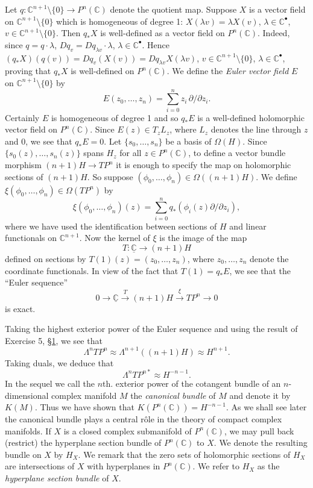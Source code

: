 Let $q:\mathbb C^{n+1}\setminus\{0\}\to P^n(\mathbb C)$ denote the quotient map. Suppose $X$ is a vector field on $\mathbb C^{n+1}\setminus\{0\}$ which is homogeneous of degree 1: $X(\lambda v)=\lambda X(v)$, $\lambda\in\mathbb C^\bullet$, $v\in\mathbb C^{n+1}\setminus\{0\}$. Then $q_*X$ is well-defined as a vector field on $P^n(\mathbb C)$. Indeed, since $q=q\cdot\lambda$, $Dq_v=Dq_{\lambda v}\cdot\lambda$, $\lambda\in\mathbb C^\bullet$. Hence $(q_*X)(q(v))=Dq_v(X(v))=Dq_{\lambda v}X(\lambda v)$, $v\in\mathbb C^{n+1}\setminus\{0\}$, $\lambda\in\mathbb C^\bullet$, proving that $q_*X$ is well-defined on $P^n(\mathbb C)$. We define the \emph{Euler vector field} $E$ on $\mathbb C^{n+1}\setminus\{0\}$ by
\[E(z_0,\ldots,z_n)=\sum_{i=0}^nz_i\,\partial/\partial z_i.\]
Certainly $E$ is homogeneous of degree 1 and so $q_*E$ is a well-defined holomorphic vector field on $P^n(\mathbb C)$. Since $E(z)\in T_zL_z$, where $L_z$ denotes the line through $z$ and 0, we see that $q_*E=0$. Let $\{s_0,\ldots,s_n\}$ be a basis of $\Omega(H)$. Since $\{s_0(z),\ldots,s_n(z)\}$ spans $H_z$ for all $z\in P^n(\mathbb C)$, to define a vector bundle morphism $(n+1)H\to TP^n$ it is enough to specify the map on holomorphic sections of $(n+1)H$. So suppose $(\phi_0,\ldots,\phi_n)\in\Omega((n+1)H)$. We define $\xi(\phi_0,\ldots,\phi_n)\in\Omega(TP^n)$ by
\[\xi(\phi_0,\ldots,\phi_n)(z)=\sum_{i=0}^nq_*(\phi_i(z)\partial/\partial z_i),\]
where we have used the identification between sections of $H$ and linear functionals on $\mathbb C^{n+1}$. Now the kernel of $\xi$ is the image of the map
\[T:\underline{\mathbb C}\to(n+1)H\]
defined on sections by $T(1)(z)=(z_0,\ldots,z_n)$, where $z_0,\ldots,z_n$ denote the coordinate functionals. In view of the fact that $T(1)=q_*E$, we see that the ``Euler sequence''
\[0\to\underline{\mathbb C}\xrightarrow{T}(n+1)H\xrightarrow{\xi}TP^n\to0\]
is exact.

Taking the highest exterior power of the Euler sequence and using the result of Exercise 5, \hyperref[sec:5:1]{\S1}, we see that
\[\Lambda^nTP^n\approx\Lambda^{n+1}((n+1)H)\approx H^{n+1}.\]
Taking duals, we deduce that
\[\Lambda^nTP^{n*}\approx H^{-n-1}.\]
In the sequel we call the $n$th. exterior power of the cotangent bundle of an $n$-dimensional complex manifold $M$ the \emph{canonical bundle} of $M$ and denote it by $K(M)$. Thus we have shown that $K(P^n(\mathbb C))=H^{-n-1}$. As we shall see later the canonical bundle plays a central r\^ole in the theory of compact complex manifolds.
If $X$ is a closed complex submanifold of $P^n(\mathbb C)$, we may pull back (restrict) the hyperplane section bundle of $P^n(\mathbb C)$ to $X$. We denote the resulting bundle on $X$ by $H_X$. We remark that the zero sets of holomorphic sections of $H_X$ are intersections of $X$ with hyperplanes in $P^n(\mathbb C)$. We refer to $H_X$ as the \emph{hyperplane section bundle} of $X$.
